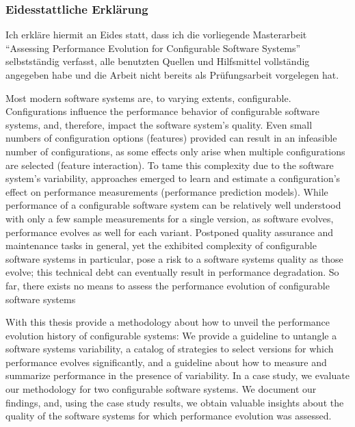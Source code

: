 \documentclass[
	12pt,
	a4paper,
	oneside,
	openright,
	listof=totoc%
]{scrbook}
\begin{document}

\newpage
\thispagestyle{empty}


 $$\qquad$$
 $$\qquad$$
 $$\qquad$$
 $$\qquad$$
 $$\qquad$$
 $$\qquad$$
 
\subsubsection*{Eidesstattliche Erklärung}
Ich erkläre hiermit an Eides statt, dass ich die vorliegende Masterarbeit
``Assessing Performance Evolution for Configurable Software Systems''
selbstständig verfasst, alle benutzten Quellen und Hilfsmittel vollständig
angegeben habe und die Arbeit nicht bereits als Prüfungsarbeit vorgelegen hat.

\vspace{1.3cm}



\clearpage
\setcounter{page}{1}
Most modern software systems are, to varying extents, configurable.
Configurations influence the performance behavior of configurable software
systems, and, therefore, impact the software system’s quality. Even small
numbers of configuration options (features) provided can result in an
infeasible number of configurations, as some effects only arise when multiple
configurations are selected (feature interaction).  To tame this complexity due
to the software system’s variability, approaches emerged to learn and estimate
a configuration’s effect on performance measurements (performance prediction
models). While performance of a configurable software system can be relatively
well understood with only a few sample measurements for a single version, as
software evolves, performance evolves as well for each variant. Postponed
quality assurance and maintenance tasks in general, yet the exhibited
complexity of configurable software systems in particular, pose a risk to a
software systems quality as those evolve; this technical debt can eventually
result in performance degradation. So far, there exists no means to assess the
performance evolution of configurable software systems

With this thesis provide a methodology about how to unveil the performance
evolution history of configurable systems: We provide a  guideline to untangle
a software systems variability, a catalog of strategies to select versions for
which performance evolves significantly, and a guideline about how to measure
and summarize performance in the presence of variability. In a case study, we
evaluate our methodology for two configurable software systems. We document our
findings, and, using the case study results, we obtain valuable insights
about the quality of the software systems for which performance evolution was
assessed.
\end{document}

